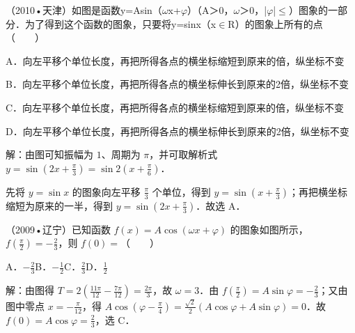 \begin{question}
（2010•天津）如图是函数y=Asin（\ensuremath{\omega}x+\ensuremath{\varphi}）（A＞0，\ensuremath{\omega}＞0，|\ensuremath{\varphi}|\ensuremath{\le}）图象的一部分．为了得到这个函数的图象，只要将y=sinx（x\ensuremath{\in}R）的图象上所有的点（　　）\par
{}\par
A．向左平移个单位长度，再把所得各点的横坐标缩短到原来的倍，纵坐标不变\par
B．向左平移个单位长度，再把所得各点的横坐标伸长到原来的2倍，纵坐标不变\par
C．向左平移个单位长度，再把所得各点的横坐标缩短到原来的倍，纵坐标不变\par
D．向左平移个单位长度，再把所得各点的横坐标伸长到原来的2倍，纵坐标不变\par
\begin{solution}
解：由图可知振幅为 $1$、周期为 $\pi$，并可取解析式 $y=\sin(2x+\frac{\pi}{3})=\sin2(x+\frac{\pi}{6})$．\par
先将 $y=\sin x$ 的图象向左平移 $\frac{\pi}{3}$ 个单位，得到 $y=\sin(x+\frac{\pi}{3})$；再把横坐标缩短为原来的一半，得到 $y=\sin(2x+\frac{\pi}{3})$．故选 A．\par
\end{solution}
\end{question}

\begin{question}
（2009•辽宁）已知函数 $f(x)=A\cos(\omega x+\varphi)$ 的图象如图所示，$f(\frac{\pi}{2})=-\frac23$，则 $f(0)=$（　　）\par
{}\par
A．$-\frac23$\qquad B．$-\frac12$\qquad C．$\frac23$\qquad D．$\frac12$\par
\begin{solution}
解：由图得 $T=2(\frac{11\pi}{12}-\frac{7\pi}{12})=\frac{2\pi}{3}$，故 $\omega=3$．由 $f(\frac{\pi}{2})=A\sin\varphi=-\frac23$；又由图中零点 $x=-\frac{\pi}{12}$，得 $A\cos(\varphi-\frac{\pi}{4})=\frac{\sqrt2}{2}(A\cos\varphi+A\sin\varphi)=0$．故 $f(0)=A\cos\varphi=\frac23$，选 C．\par
\end{solution}
\end{question}


